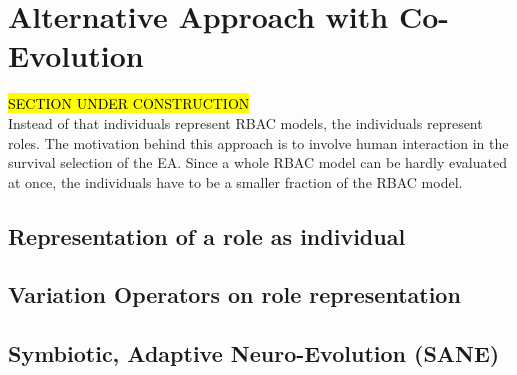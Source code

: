     \section{Alternative Approach with Co-Evolution}
    \hl{SECTION UNDER CONSTRUCTION}\\
    Instead of that individuals represent RBAC models, the individuals represent roles. The motivation behind this approach is to involve human interaction in the survival selection of the EA. Since a whole RBAC model can be hardly evaluated at once, the individuals have to be a smaller fraction of the RBAC model.
        \subsection{Representation of a role as individual}
        \subsection{Variation Operators on role representation}
        \subsection{Symbiotic, Adaptive Neuro-Evolution (SANE)}
